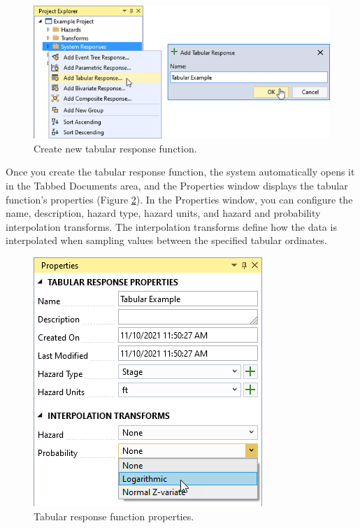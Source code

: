 \documentclass[
]{book}
\begin{document}
\begin{figure}

{\centering \includegraphics{images/figure102} 

}

\caption{Create new tabular response function.}\label{fig:figure-102}
\end{figure}

Once you create the tabular response function, the system automatically opens it in the Tabbed Documents area, and the Properties window displays the tabular function's properties (Figure \ref{fig:figure-103}). In the Properties window, you can configure the name, description, hazard type, hazard units, and hazard and probability interpolation transforms. The interpolation transforms define how the data is interpolated when sampling values between the specified tabular ordinates.

\begin{figure}

{\centering \includegraphics{images/figure103} 

}

\caption{Tabular response function properties.}\label{fig:figure-103}
\end{figure}
\end{document}
